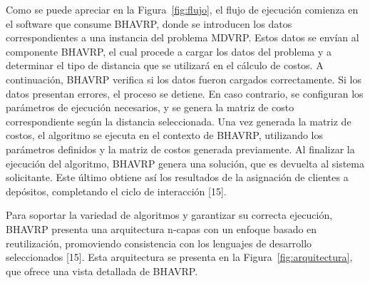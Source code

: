 Como se puede apreciar en la Figura~\ref{fig:flujo}, el flujo de ejecuci\'on comienza en el software que consume BHAVRP, donde se introducen los datos correspondientes a una instancia del problema MDVRP. Estos datos se env\'ian al componente BHAVRP, el cual procede a cargar los datos del problema y a determinar el tipo de distancia que se utilizar\'a en el c\'alculo de costos. A continuaci\'on, BHAVRP verifica si los datos fueron cargados correctamente. Si los datos presentan errores, el proceso se detiene. En caso contrario, se configuran los par\'ametros de ejecuci\'on necesarios, y se genera la matriz de costo correspondiente seg\'un la distancia seleccionada. Una vez generada la matriz de costos, el algoritmo se ejecuta en el contexto de BHAVRP, utilizando los par\'ametros definidos y la matriz de costos generada previamente. Al finalizar la ejecuci\'on del algoritmo, BHAVRP genera una soluci\'on, que es devuelta al sistema solicitante. Este \'ultimo obtiene as\'i los resultados de la asignaci\'on de clientes a dep\'ositos, completando el ciclo de interacci\'on [15].


Para soportar la variedad de algoritmos y garantizar su correcta ejecuci\'on, BHAVRP presenta una arquitectura n-capas con un enfoque basado en reutilizaci\'on, promoviendo consistencia con los lenguajes de desarrollo seleccionados [15]. Esta arquitectura se presenta en la Figura~\ref{fig:arquitectura}, que ofrece una vista detallada de BHAVRP.


